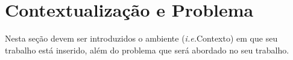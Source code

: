 

\section{Contextualização e Problema}
    \label{subsec:contextualizacao-problema}

    Nesta seção devem ser introduzidos o ambiente (\textit{i.e.}Contexto) em que seu trabalho está inserido, além do problema que será abordado no seu trabalho.